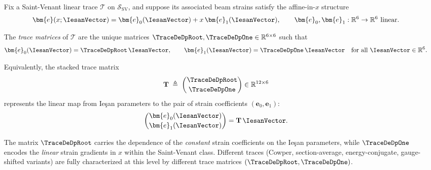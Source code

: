\begin{definition}
\label{def:trace-matrices}
Fix a Saint-Venant linear trace $\mathcal{T}$ on $\mathcal{S}_{\mathrm{SV}}$, 
and suppose its associated beam strains satisfy the affine-in-$x$ structure
\begin{equation}
\bm{e}(x;\IesanVector)
=
\bm{e}_0(\IesanVector) + x\,\bm{e}_1(\IesanVector),
\qquad
\bm{e}_0,\bm{e}_1 : \mathbb{R}^6 \to \mathbb{R}^6 \ \text{linear}.
\label{eq:trace-affine-e}
\end{equation}

The \emph{trace matrices} of $\mathcal{T}$ are the unique matrices
$\TraceDeDpRoot,\TraceDeDpOne \in \mathbb{R}^{6\times 6}$ such that
\begin{equation}
\label{eq:def-T0-T1}
\bm{e}_0(\IesanVector) = \TraceDeDpRoot\,\IesanVector,
\qquad
\bm{e}_1(\IesanVector) = \TraceDeDpOne\,\IesanVector
\quad
\text{for all }\IesanVector\in\mathbb{R}^6.
\end{equation}

Equivalently, the stacked trace matrix
\begin{equation}
\label{eq:def-Tstack}
\mathbf{T}
\;\triangleq\;
\begin{pmatrix}
\TraceDeDpRoot \\[2pt]
\TraceDeDpOne
\end{pmatrix}
\in \mathbb{R}^{12\times 6}
\end{equation}
represents the linear map from Ieşan parameters to the pair of strain 
coefficients $(\bm{e}_0,\bm{e}_1)$:
\begin{equation}
\label{eq:Tstack-map}
\begin{pmatrix}
\bm{e}_0(\IesanVector) \\[2pt]
\bm{e}_1(\IesanVector)
\end{pmatrix}
=
\mathbf{T}\,\IesanVector.
\end{equation}
\end{definition}

\begin{remark}
The matrix $\TraceDeDpRoot$ carries the dependence of the \emph{constant} strain 
coefficients on the Ieşan parameters, while $\TraceDeDpOne$ encodes the 
\emph{linear} strain gradients in $x$ within the Saint-Venant class. Different 
traces (Cowper, section-average, energy-conjugate, gauge-shifted variants) are 
fully characterized at this level by different trace matrices 
$(\TraceDeDpRoot,\TraceDeDpOne)$.
\end{remark}

